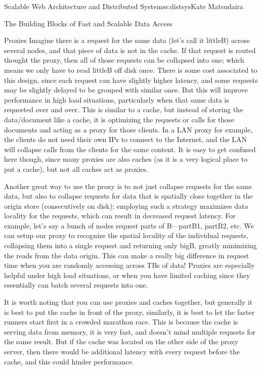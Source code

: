 \begin{aosachapter}{Scalable Web Architecture and Distributed Systems}{s:distsys}{Kate Matsudaira}
\begin{aosasect1}{The Building Blocks of Fast and Scalable Data Access}
\begin{aosasect2}{Proxies}
Imagine there is a request for the same data (let's call it littleB)
across several nodes, and that piece of data is not in the cache. If
that request is routed thought the proxy, then all of those requests
can be collapsed into one; which means we only have to read littleB
off disk once. There is some cost associated to this design, since
each request can have slightly higher latency, and some requests may
be slightly delayed to be grouped with similar ones. But this will
improve performance in high load situations, particularly when that
same data is requested over and over. This is similar to a cache, but
instead of storing the data/document like a cache, it is optimizing
the requests or calls for those documents and acting as a proxy for
those clients. In a LAN proxy for example, the clients do not need
their own IPs to connect to the Internet, and the LAN will collapse
calls from the clients for the same content. It is easy to get
confused here though, since many proxies are also caches (as it is a
very logical place to put a cache), but not all caches act as proxies.


Another great way to use the proxy is to not just collapse requests
for the same data, but also to collapse requests for data that is
spatially close together in the origin store (consecutively on disk);
employing such a strategy maximizes data locality for the requests,
which can result in decreased request latency. For example, let's say
a bunch of nodes request parts of B---partB1, partB2, etc. We can
setup our proxy to recognize the spatial locality of the individual
requests, collapsing them into a single request and returning only
bigB, greatly minimizing the reads from the data origin. This can make
a really big difference in request time when you are randomly
accessing across TBs of data! Proxies are especially helpful under
high load situations, or when you have limited caching since they
essentially can batch several requests into one.


It is worth noting that you can use proxies and caches together, but
generally it is best to put the cache in front of the proxy,
similarly, it is best to let the faster runners start first in a
crowded marathon race. This is because the cache is serving data from
memory, it is very fast, and doesn't mind multiple requests for the
same result. But if the cache was located on the other side of the
proxy server, then there would be additional latency with every
request before the cache, and this could hinder performance.


\end{aosasect2}
\end{aosasect1}
\end{aosachapter}
